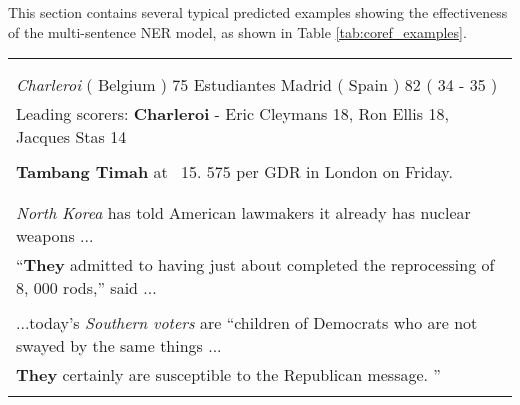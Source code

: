 \documentclass[11pt,a4paper]{article}
\begin{document}
This section contains several typical predicted examples showing the effectiveness of the multi-sentence NER model, as shown in Table \ref{tab:coref_examples}.
\begin{table*}[t]
    \centering
    \begin{tabular}{lll}
    \Xhline{3\arrayrulewidth} 
    \multicolumn{3}{c}{\textbf{CoNLL03}} \\
    \Xhline{2\arrayrulewidth}
    \multicolumn{3}{c}{\texttt{Location} (single), \texttt{Organization} (multi), \texttt{Organization} (gold)} \\
\multicolumn{3}{l}{\textit{Charleroi} ( Belgium ) 75 Estudiantes Madrid ( Spain ) 82 ( 34 - 35 )}\\
 \multicolumn{3}{l}{Leading scorers: \textbf{Charleroi} - Eric Cleymans 18, Ron Ellis 18, Jacques Stas 14 } \\
    \Xhline{2\arrayrulewidth}
    \multicolumn{3}{c}{\texttt{Person} (single), \texttt{Organization} (multi), \texttt{Organization} (gold)} \\
    \multicolumn{3}{l}{\textbf{Tambang Timah} at \ 15. 575 per GDR in London on Friday. } \\
    \Xhline{3\arrayrulewidth} 
    \multicolumn{3}{c}{\textbf{ACE05}} \\
    \Xhline{2\arrayrulewidth}
    \multicolumn{3}{c}{\texttt{Person} (single), \texttt{Organization} (multi), \texttt{Organization} (gold)} \\
 \multicolumn{3}{l}{\textit{North Korea} has told American lawmakers it already has nuclear weapons ... } \\
    \multicolumn{3}{l}{``\textbf{They} admitted to having just about completed the reprocessing of 8, 000 rods,'' said ...} \\
    \Xhline{2\arrayrulewidth}
    \multicolumn{3}{c}{\texttt{Geographical Entity} (single), \texttt{Person} (multi), \texttt{Person} (gold)} \\
 \multicolumn{3}{l}{...today's \textit{Southern voters} are ``children of Democrats who are not swayed by the same things ... } \\
    \multicolumn{3}{l}{\textbf{They} certainly are susceptible to the Republican message. ''} \\
    \Xhline{3\arrayrulewidth}
    \end{tabular}
    \caption{Typical examples where the proposed NER model showed improvements with multi-sentence input. A \textbf{boldface} word presents a target for predicting the NE label, and an \textit{italic} word is a coreference to the boldface word. NE labels shown on top of each example are the prediction from single-sentence input; that from multi-sentence input; and the ground-truth label. We can infer that the model with multi-sentence input made correct predictions, looking at coreferential words.}
    \label{tab:coref_examples}
\end{table*}
 
\end{document}
